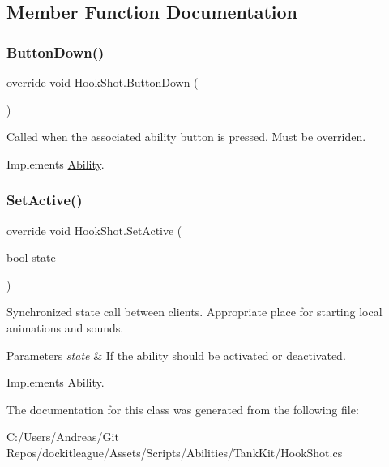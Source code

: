 \subsection{Member Function Documentation}
\hypertarget{class_hook_shot_a73e3191ef5ef7910106a40e2fa508503}{}\label{class_hook_shot_a73e3191ef5ef7910106a40e2fa508503} 
\subsubsection{\texorpdfstring{Button\+Down()}{ButtonDown()}}
{\footnotesize\ttfamily override void Hook\+Shot.\+Button\+Down (\begin{DoxyParamCaption}{ }\end{DoxyParamCaption})\hspace{0.3cm}{\ttfamily [virtual]}}



Called when the associated ability button is pressed. Must be overriden. 



Implements \hyperlink{class_ability_a7722265862f8b29828315725415ce266}{Ability}.

\hypertarget{class_hook_shot_a0b3f1e1b2b5bd9e75ba533c5a477fe7f}{}\label{class_hook_shot_a0b3f1e1b2b5bd9e75ba533c5a477fe7f} 
\subsubsection{\texorpdfstring{Set\+Active()}{SetActive()}}
{\footnotesize\ttfamily override void Hook\+Shot.\+Set\+Active (\begin{DoxyParamCaption}\item[{bool}]{state }\end{DoxyParamCaption})\hspace{0.3cm}{\ttfamily [virtual]}}



Synchronized state call between clients. Appropriate place for starting local animations and sounds. 


\begin{DoxyParams}{Parameters}
{\em state} & If the ability should be activated or deactivated.\\
\hline
\end{DoxyParams}


Implements \hyperlink{class_ability_a10f7f3c2b63eeef6e352aee48d246384}{Ability}.



The documentation for this class was generated from the following file\+:\begin{DoxyCompactItemize}
\item 
C\+:/\+Users/\+Andreas/\+Git Repos/dockitleague/\+Assets/\+Scripts/\+Abilities/\+Tank\+Kit/Hook\+Shot.\+cs\end{DoxyCompactItemize}
